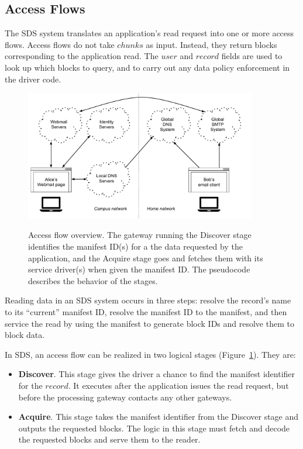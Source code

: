 \subsection{Access Flows}

The SDS system translates an application's read request into one or more access
flows.  Access flows do not take $chunks$ as input.  Instead, they return blocks
corresponding to the application read.  The $user$ and $record$ fields are used
to look up which blocks to query, and to carry out any data policy enforcement
in the driver code.

\begin{figure}[h]
   \caption{Access flow overview.  The gateway running the Discover stage
   identifies the manifest ID(s) for a the data requested by the application,
   and the Acquire stage goes and fetches them with its service driver(s)
   when given the manifest ID.  The pseudocode describes the behavior of the
   stages.}
   \centering
   \includegraphics[width=0.9\textwidth,page=7]{figures/dissertation-figures}
   \label{fig:chap2-access-flow}
\end{figure}

Reading data in an SDS system occurs in three steps:  resolve the record's name
to its ``current'' manifest ID, resolve the manifest ID to the manifest, and
then service the read by using the manifest to generate block IDs and resolve
them to block data.

In SDS, an access flow can be realized in two logical stages
(Figure~\ref{fig:chap2-access-flow}).  They are:

\begin{itemize}
    \item \textbf{Discover}.  This stage gives the driver a chance to find the
manifest identifier for the $record$.  It executes after the application issues
the read request, but before the processing gateway contacts any other gateways.
    \item \textbf{Acquire}.  This stage takes the manifest identifier from the
Discover stage and outputs the requested blocks.  The logic in this 
stage must fetch and decode the requested blocks and serve them to the reader.
\end{itemize}

